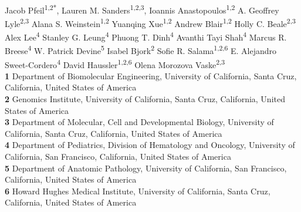 \documentclass[10pt,letterpaper]{article}
\begin{document}
\vspace*{0.2in}

\begin{flushleft}
{\Large
\textbf{} %
}
\newline
\\
Jacob Pfeil\textsuperscript{1,2*},
Lauren M. Sanders\textsuperscript{1,2,3},
Ioannis Anastopoulos\textsuperscript{1,2}
A. Geoffrey Lyle\textsuperscript{2,3}
Alana S. Weinstein\textsuperscript{1,2}
Yuanqing Xue\textsuperscript{1,2}
Andrew Blair\textsuperscript{1,2}
Holly C. Beale\textsuperscript{2,3}
Alex Lee\textsuperscript{4}
Stanley G. Leung\textsuperscript{4}
Phuong T. Dinh\textsuperscript{4}
Avanthi Tayi Shah\textsuperscript{4}
Marcus R. Breese\textsuperscript{4}
W. Patrick Devine\textsuperscript{5}
Isabel Bjork\textsuperscript{2}
Sofie R. Salama\textsuperscript{1,2,6}
E. Alejandro Sweet-Cordero\textsuperscript{4}
David Haussler\textsuperscript{1,2,6}
Olena Morozova Vaske\textsuperscript{2,3}
\\
\bigskip
\textbf{1} Department of Biomolecular Engineering, University of California, Santa Cruz, California, United States of America
\\
\textbf{2} Genomics Institute, University of California, Santa Cruz, California, United States of America
\\
\textbf{3} Department of Molecular, Cell and Developmental Biology, University of California, Santa Cruz, California, United States of America
\\
\textbf{4} Department of Pediatrics, Division of Hematology and Oncology, University of California, San Francisco, California, United States of America
\\
\textbf{5} Department of Anatomic Pathology, University of California, San Francisco, California, United States of America
\\
\textbf{6} Howard Hughes Medical Institute, University of California, Santa Cruz, California, United States of America
\\
\bigskip


\end{flushleft}
\end{document}

